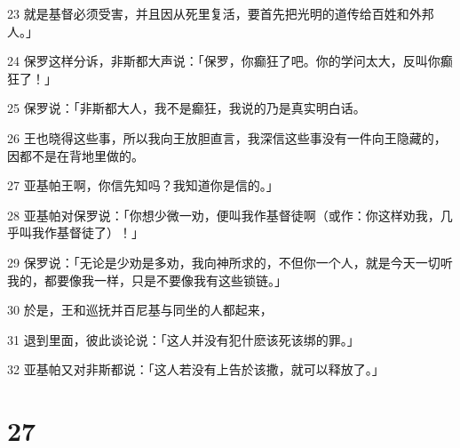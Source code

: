 \par 23 就是基督必须受害，并且因从死里复活，要首先把光明的道传给百姓和外邦人。」
\par 24 保罗这样分诉，非斯都大声说：「保罗，你癫狂了吧。你的学问太大，反叫你癫狂了！」
\par 25 保罗说：「非斯都大人，我不是癫狂，我说的乃是真实明白话。
\par 26 王也晓得这些事，所以我向王放胆直言，我深信这些事没有一件向王隐藏的，因都不是在背地里做的。
\par 27 亚基帕王啊，你信先知吗？我知道你是信的。」
\par 28 亚基帕对保罗说：「你想少微一劝，便叫我作基督徒啊（或作：你这样劝我，几乎叫我作基督徒了）！」
\par 29 保罗说：「无论是少劝是多劝，我向神所求的，不但你一个人，就是今天一切听我的，都要像我一样，只是不要像我有这些锁链。」
\par 30 於是，王和巡抚并百尼基与同坐的人都起来，
\par 31 退到里面，彼此谈论说：「这人并没有犯什麽该死该绑的罪。」
\par 32 亚基帕又对非斯都说：「这人若没有上告於该撒，就可以释放了。」

\chapter{27}


